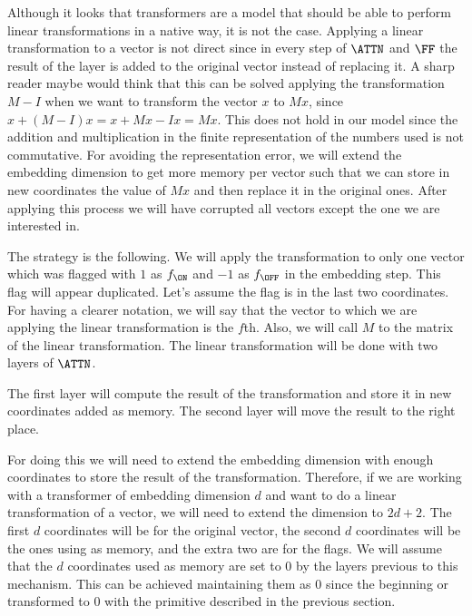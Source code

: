 Although it looks that transformers are a model that should be able to perform linear transformations in a native way, it is not the case.
Applying a linear transformation to a vector is not direct since in every step of $\ATTN$ and $\FF$ the result of the layer is added to the original vector instead of replacing it.
A sharp reader maybe would think that this can be solved applying the transformation $M-I$ when we want to transform the vector $x$ to $Mx$, since $x + (M-I)x = x + Mx - Ix = Mx$.
This does not hold in our model since the addition and multiplication in the finite representation of the numbers used is not commutative.
For avoiding the representation error, we will extend the embedding dimension to get more memory per vector such that we can store in new coordinates the value of $Mx$ and then replace it in the original ones.
After applying this process we will have corrupted all vectors except the one we are interested in.




The strategy is the following.
We will apply the transformation to only one vector which was flagged with $1$ as $f_{\ON}$ and $-1$ as $f_{\OFF}$ in the embedding step.
This flag will appear duplicated.
Let's assume the flag is in the last two coordinates.
For having a clearer notation, we will say that the vector to which we are applying the linear transformation is the $f$th.
Also, we will call $M$ to the matrix of the linear transformation.
The linear transformation will be done with two layers of $\ATTN$.

The first layer will compute the result of the transformation and store it in new coordinates added as memory.
The second layer will move the result to the right place.

For doing this we will need to extend the embedding dimension with enough coordinates to store the result of the transformation.
Therefore, if we are working with a transformer of embedding dimension $d$ and want to do a linear transformation of a vector, we will need to extend the dimension to $2d+2$.
The first $d$ coordinates will be for the original vector, the second $d$ coordinates will be the ones using as memory, and the extra two are for the flags.
We will assume that the $d$ coordinates used as memory are set to $0$ by the layers previous to this mechanism.
This can be achieved maintaining them as $0$ since the beginning or transformed to $0$ with the primitive described in the previous section.

